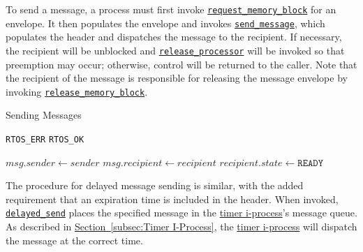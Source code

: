 \documentclass[12pt]{report}
\begin{document}
To send a message, a process must first invoke \hyperref[alg:requestingmemoryblocks]{\texttt{request_memory_block}} for an envelope. It then populates the envelope and invokes \hyperref[alg:sendingmessages]{\texttt{send_message}}, which populates the header and dispatches the message to the recipient. If necessary, the recipient will be unblocked and \hyperref[alg:releasingtheprocessor]{\texttt{release_processor}} will be invoked so that preemption may occur; otherwise, control will be returned to the caller. Note that the recipient of the message is responsible for releasing the message envelope by invoking \hyperref[alg:releasingmemoryblocks]{\texttt{release_memory_block}}.\\

\begin{algorithm}
\caption{Sending Messages}
\label{alg:sendingmessages}
\begin{algorithmic}[1]
        \State \Return \texttt{RTOS_ERR}
    \EndIf
            \State \Return {}
        \EndIf
    \EndIf
    \State \Return \texttt{RTOS_OK}
\EndProcedure

\Statex

    \State $msg.sender \leftarrow sender$
    \State $msg.recipient \leftarrow recipient$
    \State {}
        \State {}
        \State $recipient.state \leftarrow \texttt{READY}$
        \State {}
        \State {} 
    \Else
        \State {}
    \EndIf
\EndProcedure
\end{algorithmic}
\end{algorithm}

The procedure for delayed message sending is similar, with the added requirement that an expiration time is included in the header. When invoked, \hyperref[alg:sendingdelayedmessages]{\texttt{delayed_send}} places the specified message in the \hyperref[subsec:Timer I-Process]{timer i-process}'s message queue. As described in \hyperref[subsec:Timer I-Process]{Section~\ref*{subsec:Timer I-Process}}, the \hyperref[subsec:Timer I-Process]{timer i-process} will dispatch the message at the correct time.\\
\end{document}
